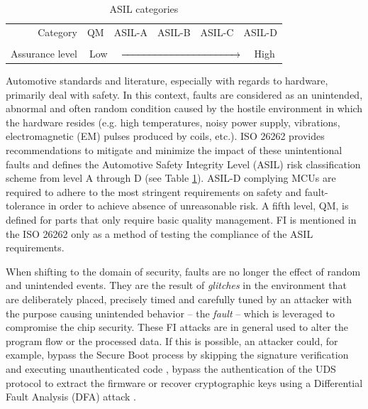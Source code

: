 \documentclass[a4paper, 10pt]{IEEEtran}
\begin{document}
\begin{table}[h]
    \caption{ASIL categories} 
    \label{tab:ASIL}
    \centering
    \begin{tabular}{rlcccr}
    \toprule
    Category        & QM  & ASIL-A & ASIL-B & ASIL-C & ASIL-D \\
                    & &&&&\\
    Assurance level &   \multicolumn{5}{c}{Low \ \   $\xrightarrow{\hspace*{4cm}}$ \ \ High} \\
    \bottomrule
    \end{tabular}
\end{table}

Automotive standards and literature, especially with regards to hardware, primarily deal with safety. In this context, faults are considered as an unintended, abnormal and often random condition caused by the hostile environment in which the hardware resides (e.g. high temperatures, noisy power supply, vibrations, electromagnetic (EM) pulses produced by coils, etc.). ISO 26262 provides recommendations to mitigate and minimize the impact of these unintentional faults and defines the Automotive Safety Integrity Level (ASIL) risk classification scheme from level A through D (see Table \ref{tab:ASIL}). ASIL-D complying MCUs are required to adhere to the most stringent requirements on safety and fault-tolerance in order to achieve absence of unreasonable risk. A fifth level, QM, is defined for parts that only require basic quality management. FI is mentioned in the ISO 26262 only as a method of testing the compliance of the ASIL requirements.  

When shifting to the domain of security, faults are no longer the effect of random and unintended events. They are the result of \emph{glitches} in the environment that are deliberately placed, precisely timed and carefully tuned by an attacker with the purpose causing unintended behavior -- the \emph{fault} -- which is leveraged to compromise the chip security. These FI attacks are in general used to alter the program flow or the processed data. If this is possible, an attacker could, for example, bypass the Secure Boot process by skipping the signature verification and executing unauthenticated code \cite{timmers_controlling_2016}, bypass the authentication of the UDS protocol to extract the firmware or recover cryptographic keys using a Differential Fault Analysis (DFA) attack \cite{biehl_differential_2000,boneh_importance_2001,giraud_dfa_2004}. 
\end{document}
